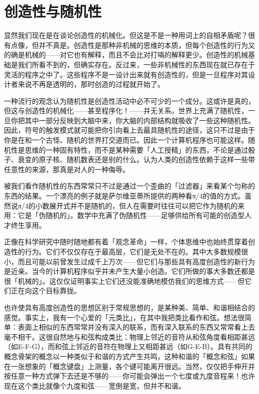 \documentclass[
  12pt,
  twoside,
  openright,
  oldfontcommands,
]{memoir}
\begin{document}
\section{创造性与随机性}

显然我们现在是在谈论创造性的机械化。但这是不是一种用词上的自相矛盾呢？很有点像，但并不真是。创造性是那种非机械的思维的本质，但每个创造性的行为又的确是机械的------对它也有解释，而且不会比对打嗝的解释更少。创造性的机械基础是我们所看不到的，但确实存在。反过来，一些非机械性的东西现在就已存在于灵活的程序之中了。这些程序不是一设计出来就有创造性的，但是一旦程序对其设计者来说不再是透明的，那时创造的过程就开始了。

一种流行的观念认为随机性是创造性活动中必不可少的一个成分。这或许是真的，但这与创造性的机械化------甚至程序化！------并无关系。世界上充满了随机性，一旦你把其中一部分反映到大脑中来，你大脑的内部结构就吸收了一些这种随机性。因此，符号的触发模式就可能把你引向看上去最具随机性的途径，这只不过是由于你是在和一个古怪、随机的世界打交道而已。因此一个计算机程序也可能这样。随机性是思维的一种固有特性，而不是某种需要「人工授精」的东西，不论是通过骰子、衰变的原子核、随机数表还是别的什么。认为人类的创造性依赖于这样一些带任意性的来源，那真是对人的一种侮辱。

被我们看作随机性的东西常常只不过是通过一个歪曲的「过滤器」来看某个匀称的东西的结果。一个漂亮的例子就是萨尔维亚蒂所提供的两种看π/4的值的方式。虽然说π/4的小数展开式并不是随机的，但人在需要时往往可以把它作为随机的来用：它是「伪随机的」。数学中充满了伪随机性------足够供给所有可能的创造型人才终生享用。

正像在科学研究中随时随地都有着「观念革命」一样，个体思维中也始终贯穿着创造性的行为。它们不仅仅存在于最高层，它们是无处不在的。其中大多数规模很小，而且可能以前曾发生过成千上万次------但它们与那些具有高度创造性的新行为是近亲。当今的计算机程序似乎并未产生大量小创造。它们所做的事大多数还都是很「机械的」。这仅仅证明事实上它们还没能准确地模仿我们的思维方式------但它们正在向这个目标靠拢。

也许使具有高度创造性的思想区别于常规思想的，是某种美、简单、和谐相结合的感觉。事实上，我有一个心爱的「元类比」，在其中我把类比看作和弦。想法很简单：表面上相似的东西常常并没有深入的联系，而有深入联系的东西又常常看上去毫不相干。这很自然地与和弦构成类比：物理上邻近的音符从和弦角度看相距甚远（如E-F-G），而和弦上邻近的音符在物理上又相距甚远（如G-E-B）。具有共同的概念骨架的概念以一种类似于和谐的方式产生共鸣，这种和谐的「概念和弦」如果在一张想象的「概念键盘」上测量，各个键可能离开很远。当然，仅仅把手伸开并按任意一种方式弹下去还是不够的------你可能会弹出一个七度或九度音程来！也许现在这个类比就像个九度和弦------宽倒是宽，但并不和谐。
\end{document}
